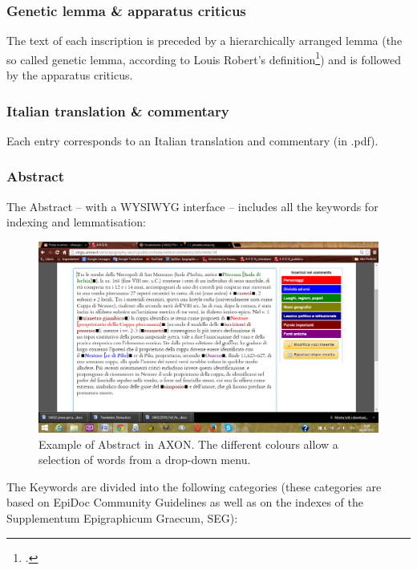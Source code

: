 \documentclass[amsthm,ebook]{saparticle}
\begin{document}
\subsubsection{Genetic lemma \& apparatus criticus}


The text of each inscription is preceded by a hierarchically arranged lemma (the so called genetic lemma, according to
Louis Robert’s definition\footnote{\citet{robert_carie:_1954}.}) and is followed by the apparatus criticus.




\subsubsection{Italian translation \& commentary}


Each entry corresponds to an Italian translation and commentary (in .pdf). 




\subsubsection{Abstract}


The Abstract – with a WYSIWYG interface – includes all the keywords for indexing and lemmatisation:

\begin{figure}[!bp]
\centering
 \includegraphics[width=\columnwidth]{EAGLE2016FullPaperrevised-img002.png}
\caption{Example of Abstract in AXON. The different colours allow a selection of words from a drop-down menu. }
\label{fig:2}
\end{figure}




The Keywords are divided into the following categories (these categories are based on EpiDoc Community Guidelines as
well as on the indexes of the Supplementum Epigraphicum Graecum, SEG):
\end{document}
